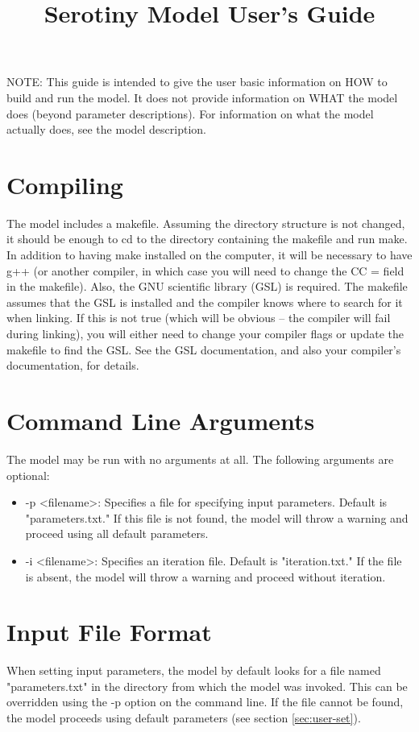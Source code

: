 \documentclass[12pt, english]{article}
\title{Serotiny Model User's Guide}
\author{}
\date{} %
\begin{document}
\maketitle
NOTE: This guide is intended to give the user basic information on HOW to build and run the model. It does not provide information on WHAT the model does (beyond parameter descriptions). For information on what the model actually does, see the model description.

\section{Compiling}
The model includes a makefile. Assuming the directory structure is not changed, it should be enough to cd to the directory containing the makefile and run make. In addition to having make installed on the computer, it will be necessary to have g++ (or another compiler, in which case you will need to change the CC = field in the makefile). Also, the GNU scientific library (GSL) is required. The makefile assumes that the GSL is installed and the compiler knows where to search for it when linking. If this is not true (which will be obvious -- the compiler will fail during linking), you will either need to change your compiler flags or update the makefile to find the GSL. See the GSL documentation, and also your compiler's documentation, for details.

\section{Command Line Arguments}
The model may be run with no arguments at all. The following arguments are optional:
\begin{itemize}
	\item{-p \textless filename\textgreater: Specifies a file for specifying input parameters. Default is "parameters.txt." If this file is not found, the model will throw a warning and proceed using all default parameters.}
	\item{-i \textless filename\textgreater: Specifies an iteration file. Default is "iteration.txt." If the file is absent, the model will throw a warning and proceed without iteration.}
\end{itemize}

\section{Input File Format}
When setting input parameters, the model by default looks for a file named "parameters.txt" in the directory from which the model was invoked. This can be overridden using the -p option on the command line. If the file cannot be found, the model proceeds using default parameters (see section \ref{sec:user-set}).
\end{document}
